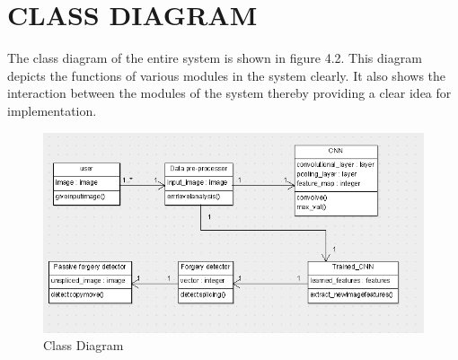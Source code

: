 \newpage
\section{CLASS DIAGRAM}
The class diagram of the entire system is shown in figure 4.2. This diagram depicts the functions of various modules in the system clearly. It also shows the interaction between the modules of the system thereby providing a clear idea for implementation.

\begin{figure}[h!]
\centering
\includegraphics[scale=0.7]{Figures/class.png}
\caption{Class Diagram}
\label{fig:universe}
\end{figure}


